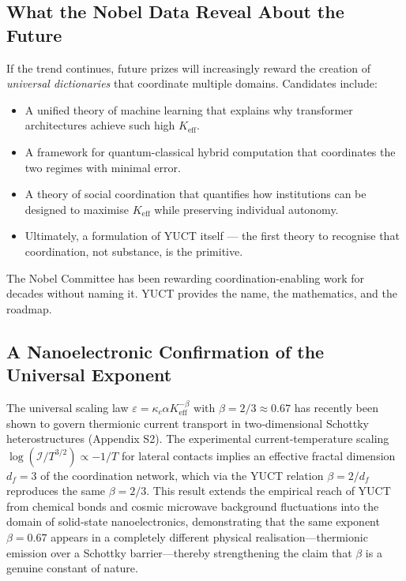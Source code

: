 \documentclass[12pt,a4paper]{article}
\begin{document}
	\subsection{What the Nobel Data Reveal About the Future}
	
	If the trend continues, future prizes will increasingly reward the creation of \emph{universal dictionaries} that coordinate multiple domains. Candidates include:
	\begin{itemize}
		\item A unified theory of machine learning that explains why transformer architectures achieve such high \(K_{\mathrm{eff}}\).
		\item A framework for quantum-classical hybrid computation that coordinates the two regimes with minimal error.
		\item A theory of social coordination that quantifies how institutions can be designed to maximise \(K_{\mathrm{eff}}\) while preserving individual autonomy.
		\item Ultimately, a formulation of YUCT itself — the first theory to recognise that coordination, not substance, is the primitive.
	\end{itemize}
	The Nobel Committee has been rewarding coordination-enabling work for decades without naming it. YUCT provides the name, the mathematics, and the roadmap.
	
	\subsection{A Nanoelectronic Confirmation of the Universal Exponent}
	
	The universal scaling law \(\varepsilon = \kappa_c \alpha K_{\mathrm{eff}}^{-\beta}\) with \(\beta = 2/3 \approx 0.67\) has recently been shown to govern thermionic current transport in two‑dimensional Schottky heterostructures (Appendix S2). The experimental current‑temperature scaling \(\log(\mathcal{I}/T^{3/2}) \propto -1/T\) for lateral contacts implies an effective fractal dimension \(d_f = 3\) of the coordination network, which via the YUCT relation \(\beta = 2/d_f\) reproduces the same \(\beta = 2/3\). This result extends the empirical reach of YUCT from chemical bonds and cosmic microwave background fluctuations into the domain of solid‑state nanoelectronics, demonstrating that the same exponent \(\beta = 0.67\) appears in a completely different physical realisation—thermionic emission over a Schottky barrier—thereby strengthening the claim that \(\beta\) is a genuine constant of nature.
	
\end{document}
